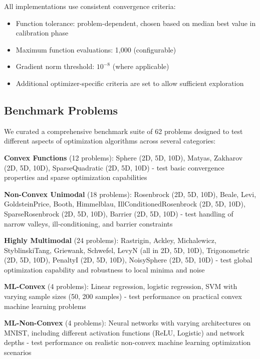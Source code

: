 All implementations use consistent convergence criteria:

\begin{itemize}
\tightlist
\item
  Function tolerance: problem-dependent, chosen based on median best value in calibration phase
\item
  Maximum function evaluations: 1,000 (configurable)
\item
  Gradient norm threshold: \(10^{-8}\) (where applicable)
\item
  Additional optimizer-specific criteria are set to allow sufficient exploration
\end{itemize}

\hypertarget{benchmark-problems}{%
\subsection{Benchmark Problems}\label{benchmark-problems}}

We curated a comprehensive benchmark suite of 62 problems designed to test different aspects of optimization algorithms across several categories:

\textbf{Convex Functions} (12 problems): Sphere (2D, 5D, 10D), Matyas, Zakharov (2D, 5D, 10D), SparseQuadratic (2D, 5D, 10D) - test basic convergence properties and sparse optimization capabilities

\textbf{Non-Convex Unimodal} (18 problems): Rosenbrock (2D, 5D, 10D), Beale, Levi, GoldsteinPrice, Booth, Himmelblau, IllConditionedRosenbrock (2D, 5D, 10D), SparseRosenbrock (2D, 5D, 10D), Barrier (2D, 5D, 10D) - test handling of narrow valleys, ill-conditioning, and barrier constraints

\textbf{Highly Multimodal} (24 problems): Rastrigin, Ackley, Michalewicz, StyblinskiTang, Griewank, Schwefel, LevyN (all in 2D, 5D, 10D), Trigonometric (2D, 5D, 10D), PenaltyI (2D, 5D, 10D), NoisySphere (2D, 5D, 10D) - test global optimization capability and robustness to local minima and noise

\textbf{ML-Convex} (4 problems): Linear regression, logistic regression, SVM with varying sample sizes (50, 200 samples) - test performance on practical convex machine learning problems

\textbf{ML-Non-Convex} (4 problems): Neural networks with varying architectures on MNIST, including different activation functions (ReLU, Logistic) and network depths - test performance on realistic non-convex machine learning optimization scenarios

